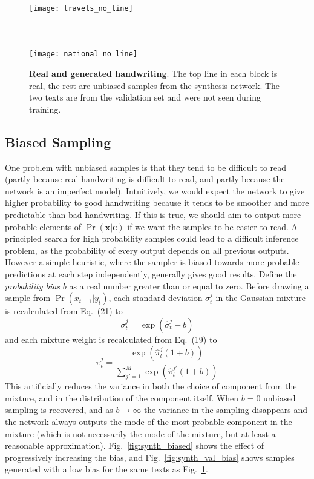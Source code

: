 \documentclass{article}
\newcommand{\flabel}[1]{\label{fig:#1}}
\newcommand{\fref}[1]{Fig.~\ref{fig:#1}}
\newcommand{\seq}[1]{\mathbf{#1}}
\newcommand{\invble}{x}
\newcommand{\inseq}{\seq{\invble}}
\newcommand{\ann}{\seq{c}}
\newcommand{\expo}[1]{\exp\left(#1\right)}
\begin{document}
\begin{figure}
\texttt{[image: travels\_no\_line]}\\
\\
\\
\\
\texttt{[image: national\_no\_line]}
\\
\caption{\textbf{Real and generated handwriting}. The top line in each block is real, the rest are unbiased samples from the synthesis network. The two texts are from the validation set and were not seen during training.}
\flabel{synth_val}
\end{figure}


\subsection{Biased Sampling}
One problem with unbiased samples is that they tend to be difficult to read (partly because real handwriting is difficult to read, and partly because the network is an imperfect model).
Intuitively, we would expect the network to give higher probability to good handwriting because it tends to be smoother and more predictable than bad handwriting.
If this is true, we should aim to output more probable elements of $\Pr(\inseq|\ann)$ if we want the samples to be easier to read. 
A principled search for high probability samples could lead to a difficult inference problem, as the probability of every output depends on all previous outputs.
However a simple heuristic, where the sampler is biased towards more probable predictions at each step independently, generally gives good results.
Define the \emph{probability bias} $b$ as a real number greater than or equal to zero.
Before drawing a sample from $\Pr(x_{t+1}|y_t)$, each standard deviation $\sigma^j_t$ in the Gaussian mixture is recalculated from Eq.~(21) to 
\begin{equation}
\sigma^j_t = \expo{\hat{\sigma}^j_t - b}
\end{equation}
and each mixture weight is recalculated from Eq.~(19) to
\begin{equation}
\pi^j_t = \frac{\expo{\hat{\pi}^j_t(1+b)}}{\sum_{j'=1}^M{\expo{\hat{\pi}^{j'}_t(1+b)}}}
\end{equation}
This artificially reduces the variance in both the choice of component from the mixture, and in the distribution of the component itself.
When $b=0$ unbiased sampling is recovered, and as $b \rightarrow \infty$ the variance in the sampling disappears and the network always outputs the mode of the most probable component in the mixture (which is not necessarily the mode of the mixture, but at least a reasonable approximation).
\fref{synth_biased} shows the effect of progressively increasing the bias, and \fref{synth_val_bias} shows samples generated with a low bias for the same texts as \fref{synth_val}.
\end{document}
